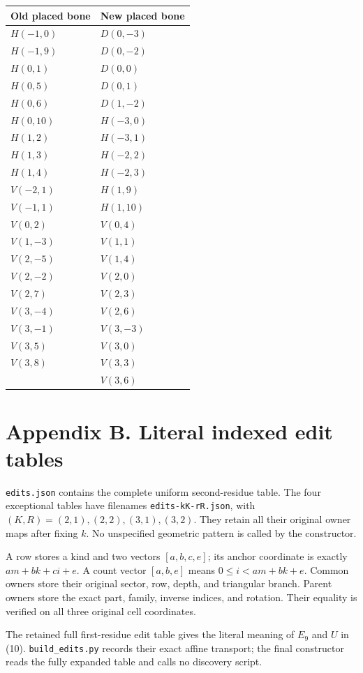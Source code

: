\documentclass[
  11pt,
]{article}
\begin{document}
\begin{longtable}[]{@{}ll@{}}
\toprule\noalign{}
Old placed bone & New placed bone \\
\midrule\noalign{}
\endhead
\bottomrule\noalign{}
\endlastfoot
\(H(-1,0)\) & \(D(0,-3)\) \\
\(H(-1,9)\) & \(D(0,-2)\) \\
\(H(0,1)\) & \(D(0,0)\) \\
\(H(0,5)\) & \(D(0,1)\) \\
\(H(0,6)\) & \(D(1,-2)\) \\
\(H(0,10)\) & \(H(-3,0)\) \\
\(H(1,2)\) & \(H(-3,1)\) \\
\(H(1,3)\) & \(H(-2,2)\) \\
\(H(1,4)\) & \(H(-2,3)\) \\
\(V(-2,1)\) & \(H(1,9)\) \\
\(V(-1,1)\) & \(H(1,10)\) \\
\(V(0,2)\) & \(V(0,4)\) \\
\(V(1,-3)\) & \(V(1,1)\) \\
\(V(2,-5)\) & \(V(1,4)\) \\
\(V(2,-2)\) & \(V(2,0)\) \\
\(V(2,7)\) & \(V(2,3)\) \\
\(V(3,-4)\) & \(V(2,6)\) \\
\(V(3,-1)\) & \(V(3,-3)\) \\
\(V(3,5)\) & \(V(3,0)\) \\
\(V(3,8)\) & \(V(3,3)\) \\
& \(V(3,6)\) \\
\end{longtable}

\section{Appendix B. Literal indexed edit
tables}\label{appendix-b.-literal-indexed-edit-tables}

\texttt{edits.json} contains the complete uniform second-residue table.
The four exceptional tables have filenames \texttt{edits-kK-rR.json},
with \((K,R)=(2,1),(2,2),(3,1),(3,2)\). They retain all their original
owner maps after fixing \(k\). No unspecified geometric pattern is
called by the constructor.

A row stores a kind and two vectors \([a,b,c,e]\); its anchor coordinate
is exactly \(am+bk+ci+e\). A count vector \([a,b,e]\) means
\(0\le i<am+bk+e\). Common owners store their original sector, row,
depth, and triangular branch. Parent owners store the exact part,
family, inverse indices, and rotation. Their equality is verified on all
three original cell coordinates.

The retained full first-residue edit table gives the literal meaning of
\(E_9\) and \(U\) in (10). \texttt{build\_edits.py} records their exact
affine transport; the final constructor reads the fully expanded table
and calls no discovery script.
\end{document}
